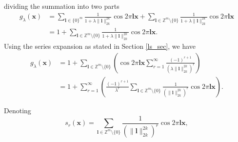 \documentclass[multixcb]{amstext-l}
\theoremstyle{plain}
\theoremstyle{definition}
\theoremstyle{definition}
\theoremstyle{remark}
\numberwithin{equation}{chapter}
\begin{document}
dividing the summation into two parts
\begin{equation}\label{eq22rs}
\begin{aligned}
    g_{\lambda}(\boldsymbol{x}) &=   \sum_{\boldsymbol{l}\in\{0\}^m} \frac{1}{1+\lambda\|\boldsymbol{l}\|_{2k}^{2k}} \cos{2\pi\boldsymbol{l}\boldsymbol{x}} + \sum_{\boldsymbol{l}\in\mathbb{Z}^m\setminus\{0\}} \frac{1}{1+\lambda\|\boldsymbol{l}\|_{2k}^{2k}} \cos{2\pi\boldsymbol{l}\boldsymbol{x}}\\
    &= 1 + \sum_{\boldsymbol{l}\in\mathbb{Z}^m\setminus\{0\}} \frac{1}{1+\lambda\|\boldsymbol{l}\|_{2k}^{2k}} \cos{2\pi\boldsymbol{l}\boldsymbol{x}}.
\end{aligned}
\end{equation}
Using the series expansion as stated in Section \ref{ls_sec}, we have 
\begin{equation}\label{eq22rs2}
\begin{aligned}
    g_{\lambda}(\boldsymbol{x}) &= 1 + \sum_{\boldsymbol{l}\in\mathbb{Z}^m\setminus\{0\}}\left( \cos{2\pi\boldsymbol{l}\boldsymbol{x}}\sum\limits_{r=1}^{\infty}\frac{(-1)^{r+1}}{(\lambda\|\boldsymbol{l}\|_{2k}^{2k})^r}\right) \\
    &= 1 +  \sum\limits_{r=1}^{\infty}\left(\frac{(-1)^{r+1}}{\lambda^{r}}\sum_{\boldsymbol{l}\in\mathbb{Z}^m\setminus\{0\}}\frac{1}{(\|\boldsymbol{l}\|_{2k}^{2k})^r}\cos{2\pi\boldsymbol{l}\boldsymbol{x}}\right).
\end{aligned}
\end{equation}

Denoting \begin{equation}\label{eq22rs3}
s_r(\boldsymbol{x}) = \sum_{\boldsymbol{l}\in\mathbb{Z}^m\setminus\{0\}}\frac{1}{(\|\boldsymbol{l}\|_{2k}^{2k})^r}\cos{2\pi\boldsymbol{l}\boldsymbol{x}},
\end{equation}
\end{document}
